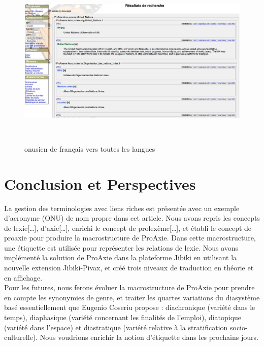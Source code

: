 \documentclass[10pt,a4paper,twoside]{article}
\begin{document}
\begin{figure}[htbp] 
\begin{center} 
\includegraphics[width=14cm]{images/scenario3.jpg}
\end{center} 
\caption{onusien de français vers toutes les langues} \label{image-scenario3} \
\end{figure}

\section{Conclusion et Perspectives}
La gestion des terminologies avec liens riches est présentée avec un exemple d’acronyme (ONU) de nom propre dans cet article. Nous avons repris les concepts de lexie[…], d’axie[…], enrichi le concept de prolexème[…],  et établi le concept de proaxie pour produire la macrostructure de ProAxie. Dans cette macrostructure, une étiquette est utilisée pour représenter les relations de lexie. Nous avons implémenté la solution de ProAxie dans la plateforme Jibiki en utilisant la nouvelle extension Jibiki-Pivax, et créé trois niveaux de traduction en théorie et en affichage. \\
Pour les futures, nous ferons évoluer la macrostructure de ProAxie pour prendre en compte les synonymies de genre, et traiter les quartes variations du diasystème basé essentiellement que Eugenio Coseriu propose : diachronique (variété dans le temps), diaphasique (variété concernant les finalités de l'emploi), diatopique (variété dans l'espace) et diastratique (variété relative à la stratification socio-culturelle). Nous voudrions enrichir la notion d’étiquette dans les prochains jours.  \\
\end{document}
